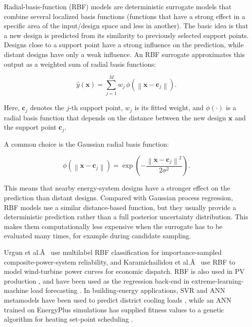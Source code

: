 Radial-basis-function (RBF) models are deterministic surrogate models
that combine several localized basis functions (functions that have a
strong effect in a specific area of the input/design space and less in
another). The basic idea is that a new design is predicted from its
similarity to previously selected support points. Designs close to a
support point have a strong influence on the prediction, while distant
designs have only a weak influence. An RBF surrogate approximates this
output as a weighted sum of radial basis functions:

$$\begin{equation}
 \hat{y}(\mathbf{x}) = \sum_{j=1}^{M} w_j \, \phi\left(\left\| \mathbf{x} - \mathbf{c}_j \right\|\right).
\end{equation}$$

Here, $\mathbf{c}_j$ denotes the $j$-th support point, $w_j$ is its
fitted weight, and $\phi(\cdot)$ is a radial basis function that depends
on the distance between the new design $\mathbf{x}$ and the support
point $\mathbf{c}_j$.

A common choice is the Gaussian radial basis function:

$$\begin{equation}
 \phi\left(\left\| \mathbf{x} - \mathbf{c}_j \right\|\right) = \exp\left( -\frac{\left\| \mathbf{x} - \mathbf{c}_j \right\|^2}{2\sigma^2} \right).
\end{equation}$$

This means that nearby energy-system designs have a stronger effect on
the prediction than distant designs. Compared with Gaussian process
regression, RBF models use a similar distance-based function, but they
usually provide a deterministic prediction rather than a full posterior
uncertainty distribution. This makes them computationally less expensive
when the surrogate has to be evaluated many times, for example during
candidate sampling.

Urgun et al.Â~\cite{Urgun20202791} use multilabel RBF classification for
importance-sampled composite-power-system reliability, and
Karamichailidou et al.Â~\cite{Karamichailidou20212137} use RBF to model
wind-turbine power curves for economic dispatch. RBF is also used in PV
production \cite{Yang2020415,Tian2020}, and have been used as the
regression back-end in extreme-learning-machine load forecasting
\cite{Zeng2017175,Sideratos2020,Madhukumar20228891,Rafi202132436}. In
building-energy applications, SVR and ANN metamodels have been used to
predict district cooling loads \cite{Jia2022553}, while an ANN trained on
EnergyPlus simulations has supplied fitness values to a genetic
algorithm for heating set-point scheduling \cite{Reynolds2017704}.

